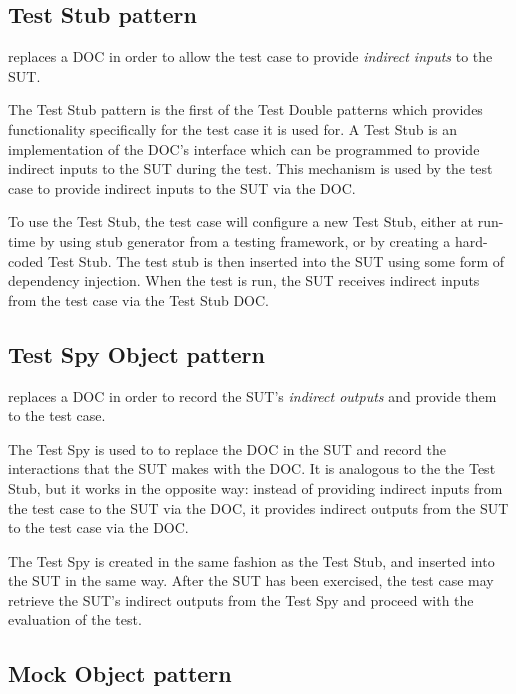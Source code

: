 
\subsection{Test Stub pattern}
\label{testdoubles:stub}

 replaces a DOC in order to allow the test case
to provide \textit{indirect inputs} to the SUT.

The Test Stub pattern is the first of the Test Double patterns which
provides functionality specifically for the test case it is used
for. A Test Stub is an implementation of the DOC's interface which can
be programmed to provide indirect inputs to the SUT during the
test. This mechanism is used by the test case to provide indirect
inputs to the SUT via the DOC.

To use the Test Stub, the test case will configure a new Test Stub,
either at run-time by using stub generator from a testing framework,
or by creating a hard-coded Test Stub. The test stub is then inserted
into the SUT using some form of dependency injection. When the test is
run, the SUT receives indirect inputs from the test case via the Test
Stub DOC.


\subsection{Test Spy Object pattern}
\label{testdoubles:spy}

 replaces a DOC in order to record the SUT's
\textit{indirect outputs} and provide them to the test case.

The Test Spy is used to to replace the DOC in the SUT and record
the interactions that the SUT makes with the DOC. It is analogous to
the the Test Stub, but it works in the opposite way: instead of
providing indirect inputs from the test case to the SUT via the DOC,
it provides indirect outputs from the SUT to the test case via the
DOC.

The Test Spy is created in the same fashion as the Test Stub, and
inserted into the SUT in the same way. After the SUT has been
exercised, the test case may retrieve the SUT's indirect outputs from
the Test Spy and proceed with the evaluation of the test.

\subsection{Mock Object pattern}
\label{testdoubles:mocks}

